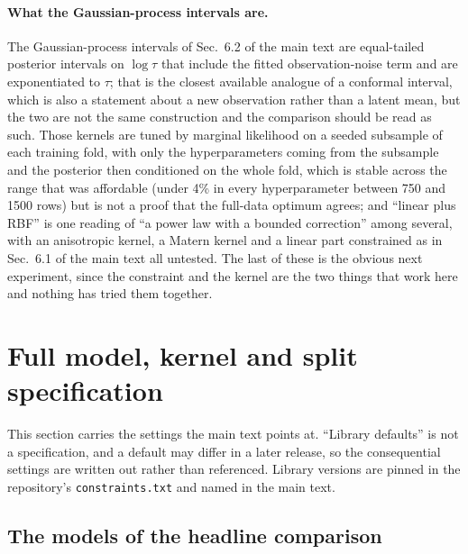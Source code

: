 \documentclass[12pt,letterpaper]{article}
\begin{document}
\paragraph{What the Gaussian-process intervals are.}
The Gaussian-process intervals of Sec.~6.2 of the main text are
equal-tailed posterior intervals on $\log\tau$ that include the fitted
observation-noise term and are exponentiated to $\tau$; that is the closest
available analogue of a conformal interval, which is also a statement about a
new observation rather than a latent mean, but the two are not the same
construction and the comparison should be read as such. Those kernels are tuned
by marginal likelihood on a seeded subsample of each training fold, with only
the hyperparameters coming from the subsample and the posterior then conditioned
on the whole fold,
which is stable across the range that was affordable (under 4\% in every
hyperparameter between 750 and 1500 rows) but is not a proof that the full-data
optimum agrees; and ``linear plus RBF'' is one reading of ``a power law with a
bounded correction'' among several, with an anisotropic kernel, a Matern kernel
and a linear part constrained as in Sec.~6.1 of the main text all untested. The
last of these is the obvious next experiment, since the constraint and the
kernel are the two things that work here and nothing has tried them together.

\section{Full model, kernel and split specification}
\label{supp:spec}

This section carries the settings the main text points at. ``Library
defaults'' is not a specification, and a default may differ in a later
release, so the consequential settings are written out rather than
referenced. Library versions are pinned in the repository's
\texttt{constraints.txt} and named in the main text.

\subsection{The models of the headline comparison}
\end{document}
